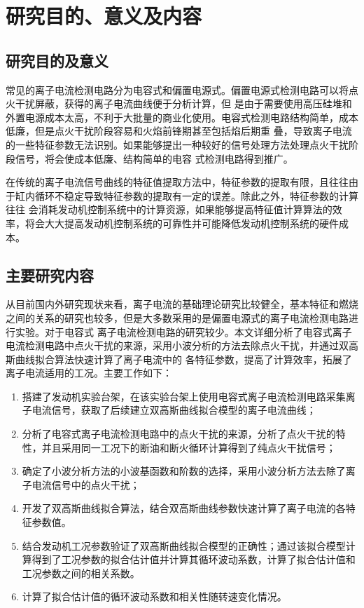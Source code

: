 \section{研究目的、意义及内容}
\subsection{研究目的及意义}
常见的离子电流检测电路分为电容式和偏置电源式。偏置电源式检测电路可以将点火干扰屏蔽，获得的离子电流曲线便于分析计算\cite{cyb2012}，但
是由于需要使用高压硅堆和外置电源成本太高，不利于大批量的商业化使用。电容式检测电路结构简单，成本低廉，但是点火干扰阶段容易和火焰前锋期甚至包括焰后期重
叠，导致离子电流的一些特征参数无法识别。如果能够提出一种较好的信号处理方法处理点火干扰阶段信号，将会使成本低廉、结构简单的电容
式检测电路得到推广。\par
在传统的离子电流信号曲线的特征值提取方法中，特征参数的提取有限，且往往由于缸内循环不稳定导致特征参数的提取有一定的误差。除此之外，特征参数的计算往往
会消耗发动机控制系统中的计算资源，如果能够提高特征值计算算法的效率，将会大大提高发动机控制系统的可靠性并可能降低发动机控制系统的硬件成本。
\subsection{主要研究内容}
从目前国内外研究现状来看，离子电流的基础理论研究比较健全，基本特征和燃烧之间的关系的研究也较多，但是大多数采用的是偏置电源式的离子电流检测电路进行实验。对于电容式
离子电流检测电路的研究较少。本文详细分析了电容式离子电流检测电路中点火干扰的来源，采用小波分析的方法去除点火干扰，并通过双高斯曲线拟合算法快速计算了离子电流中的
各特征参数，提高了计算效率，拓展了离子电流适用的工况。主要工作如下：
\begin{enumerate}[(1)]
\item 搭建了发动机实验台架，在该实验台架上使用电容式离子电流检测电路采集离子电流信号，获取了后续建立双高斯曲线拟合模型的离子电流曲线；
\item 分析了电容式离子电流检测电路中的点火干扰的来源，分析了点火干扰的特性，并且采用同一工况下的断油和断火循环计算得到了纯点火干扰信号；
\item 确定了小波分析方法的小波基函数和阶数的选择，采用小波分析方法去除了离子电流信号中的点火干扰；
\item 开发了双高斯曲线拟合算法，结合双高斯曲线参数快速计算了离子电流的各特征参数值。
\item 结合发动机工况参数验证了双高斯曲线拟合模型的正确性；通过该拟合模型计算得到了工况参数的拟合估计值并计算其循环波动系数，计算了拟合估计值和
工况参数之间的相关系数。
\item 计算了拟合估计值的循环波动系数和相关性随转速变化情况。
\end{enumerate}
